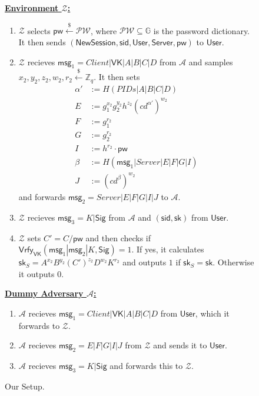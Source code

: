 \documentclass[12pt,a4paper]{article}
\newcommand{\env}{\mathcal{Z}}
\newcommand{\adv}{\mathcal{A}}
\newcommand{\user}{\mathsf{User}}
\newcommand{\sk}{\mathsf{sk}}
\newcommand{\pw}{\mathsf{pw}}
\newcommand{\newsession}{\mathsf{NewSession}}
\newcommand{\server}{\mathsf{Server}}
\newcommand{\msg}[1]{\mathsf{msg}_{#1}}
\begin{document}
	\begin{figure}[h]
		\begin{framed}[
			]
			\vspace{2mm}
			\textbf{\underline{Environment $\env$:}}
			\begin{enumerate}
				\item $\env$ selects $\pw\xleftarrow{\$}\mathcal{PW}$, where $\mathcal{PW}\subseteq\mathbb{G}$ is the password dictionary. It then sends $(\newsession,\mathsf{sid},\user,\server,\pw)$ to $\user$.
				\item $\env$ recieves $\msg{1} = Client|\mathsf{VK}|A|B|C|D$ from $\adv$ and samples $x_2, y_2, z_2, w_2, r_2\xleftarrow{\$}\mathbb{Z}_q$. It then sets 
				\begin{align*}
					\alpha'&:=H(PIDs|A|B|C|D)\\
					E &:= g_1^{x_2}g_2^{y_2}h^{z_2}(cd^{\alpha'})^{w_2}\\
					F &:= g_1^{r_2}\\
					G &:= g_2^{r_2}\\
					I &:= h^{r_2}\cdot\pw\\
					\beta &:= H(\msg{1}|Server|E|F|G|I)\\
					J &:= (cd^{\beta})^{w_2}
				\end{align*}
			and forwards $\msg{2} = Server|E|F|G|I|J$ to $\adv$.
			\item $\env$ recieves $\msg{3}=K|\mathsf{Sig}$ from $\adv$ and $(\mathsf{sid}, \sk)$ from $\user$.
			\item $\env$ sets $C'=C/\pw$ and then checks if $\mathsf{Vrfy}_{\mathsf{VK}}(\msg{1}|\msg{2}|K,\mathsf{Sig})=1$. If yes, it calculates $\sk_S=A^{x_2}B^{y_2}(C')^{z_2}D^{w_2}K^{r_2}$ and outputs $1$ if $\sk_S=\sk$. Otherwise it outputs $0$.
			\end{enumerate}
			\textbf{\underline{Dummy Adversary $\adv$:}}
			\begin{enumerate}
				\item $\adv$ recieves $\msg{1} = Client|\mathsf{VK}|A|B|C|D$ from $\user$, which it forwards to $\env$.
				\item $\adv$ recieves $\msg{2}=E|F|G|I|J$ from $\env$ and sends it to $\user$.
				\item $\adv$ recieves $\msg{3}=K|\mathsf{Sig}$ and forwards this to $\env$.
			\end{enumerate}
			\vspace{2mm}
		\end{framed}
		\caption{Our Setup.}
		\label{fig:adv}
	\end{figure}
	
\end{document}
